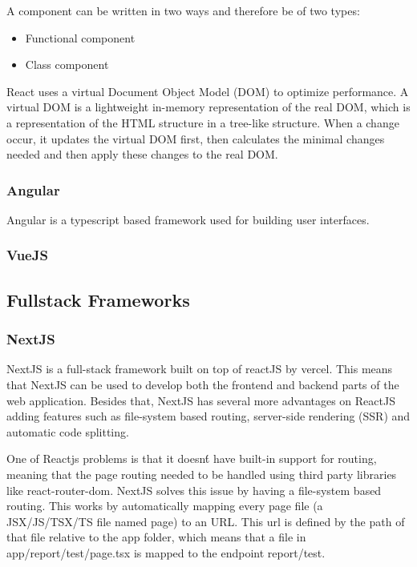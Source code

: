 A component can be written in two ways and therefore be of two types:
\begin{itemize}
	\item Functional component
	\item Class component
\end{itemize}

React uses a virtual Document Object Model (DOM) to optimize performance. A virtual
DOM is a lightweight in-memory representation of the real DOM, which is a
representation of the HTML structure in a tree-like structure. When a change
occur, it updates the virtual DOM first, then calculates the minimal changes needed
and then apply these changes to the real DOM\cite{bawane2022review}.


\subsubsection{Angular}
Angular is a typescript based framework used for building user interfaces.

\subsubsection{VueJS}

\subsection{Fullstack Frameworks}
\subsubsection{NextJS}
NextJS is a full-stack framework built on top of reactJS by vercel. This means
that NextJS can be used to develop both the frontend and backend parts of the
web application. Besides that, NextJS has several more advantages on ReactJS
adding features such as file-system based routing, server-side rendering (SSR)
and automatic code splitting.

One of Reactjs problems is that it doesn\'t have built-in support for routing,
meaning that the page routing needed to be handled using third party libraries
like react-router-dom. NextJS solves this issue by having a file-system based
routing. This works by automatically mapping every page file (a JSX/JS/TSX/TS
file named page) to an URL. This url is defined by the path of that file
relative to the app folder, which means that a file in app/report/test/page.tsx
is mapped to the endpoint report/test.

